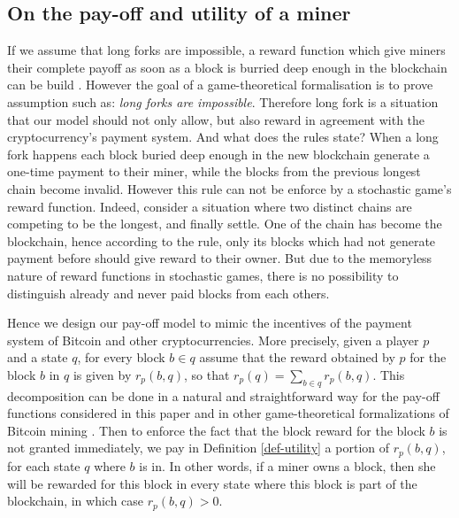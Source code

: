 
\subsection{On the pay-off and utility of a miner}
\label{sec-pay-uti}
If we assume that long forks are impossible, a reward function which give miners their complete payoff as soon as a block is burried deep enough in the blockchain can be build \cite{mininggames:2016}. However the goal of a game-theoretical formalisation is to prove assumption such as: \textit{long forks are impossible}. Therefore long fork is a situation that our model should not only allow, but also reward in agreement with the cryptocurrency's payment system. And what does the rules state? When a long fork happens each block buried deep enough in the new blockchain generate a one-time payment to their miner, while the blocks from the previous longest chain become invalid. However this rule can not be enforce by a stochastic game's reward function. Indeed, consider a situation where two distinct chains are competing to be the longest, and finally settle. One of the chain has become the blockchain, hence according to the rule, only its blocks which had not generate payment before should give reward to their owner. But due to the memoryless nature of reward functions in stochastic games, there is no possibility to distinguish already and never paid blocks from each others.

Hence we design our pay-off model to mimic the incentives of the payment system of Bitcoin and other cryptocurrencies. More precisely, given a player $p$ and a state $q$, for every block $b \in q$ assume that the reward obtained by $p$ for the block $b$ in $q$ is given by $r_p(b,q)$, so that $r_p(q) = \sum_{b \in q} r_p(b,q)$. This decomposition can be done in a natural and straightforward way for the pay-off functions considered in this paper and in other game-theoretical formalizations of Bitcoin mining \cite{mininggames:2016}. 
Then to enforce the fact that the block reward for the block $b$ is not granted immediately, we pay in Definition \ref{def-utility} a 
portion of $r_p(b,q)$, for each state $q$ where $b$ is in. In other words, if a miner owns a block, then she will be rewarded for this block in every state where this block is part of the blockchain, in which case $r_p(b,q) > 0$. %

